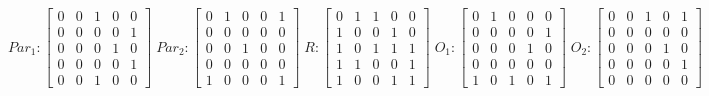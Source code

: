      $$
        Par_{1} : \begin{bmatrix}
            0 & 0 & 1 & 0 & 0 \\
            0 & 0 & 0 & 0 & 1 \\
            0 & 0 & 0 & 1 & 0 \\
			0 & 0 & 0 & 0 & 1 \\
            0 & 0 & 1 & 0 & 0 
        \end{bmatrix}
        \;
        Par_{2} : \begin{bmatrix}
            0 & 1 & 0 & 0 & 1 \\
            0 & 0 & 0 & 0 & 0 \\
            0 & 0 & 1 & 0 & 0 \\
            0 & 0 & 0 & 0 & 0 \\
            1 & 0 & 0 & 0 & 1
        \end{bmatrix}
        \;
        R : \begin{bmatrix}
            0 & 1 & 1 & 0 & 0 \\
            1 & 0 & 0 & 1 & 0 \\
            1 & 0 & 1 & 1 & 1 \\
            1 & 1 & 0 & 0 & 1 \\
            1 & 0 & 0 & 1 & 1
        \end{bmatrix}
        \;
        O_{1} : \begin{bmatrix}
            0 & 1 & 0 & 0 & 0 \\
            0 & 0 & 0 & 0 & 1 \\
            0 & 0 & 0 & 1 & 0 \\
            0 & 0 & 0 & 0 & 0 \\
            1 & 0 & 1 & 0 & 1
        \end{bmatrix}
        \;
        O_{2} : \begin{bmatrix}
            0 & 0 & 1 & 0 & 1 \\
            0 & 0 & 0 & 0 & 0 \\
            0 & 0 & 0 & 1 & 0 \\
            0 & 0 & 0 & 0 & 1 \\
            0 & 0 & 0 & 0 & 0
        \end{bmatrix}
    $$ 
